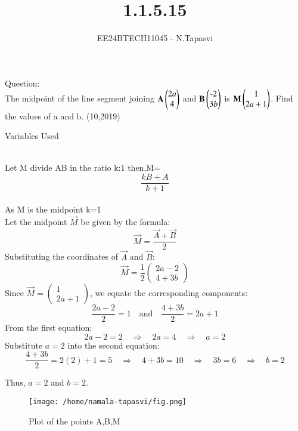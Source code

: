 \documentclass[journal]{IEEEtran}
\begin{document}

\vspace{3cm}

\title{1.1.5.15}
\author{EE24BTECH11045 - N.Tapasvi}
{\let\newpage\relax\maketitle}
Question:\\
The midpoint of the line segment joining $\mathbf{A}\begin{pmatrix}2a\\4\end{pmatrix}$ and $\mathbf{B}\begin{pmatrix}\text{-}2\\3b\end{pmatrix}$ is $\mathbf{M}\begin{pmatrix}1\\2a+1\end{pmatrix}$. Find the values of a and b.
\hfill (10,2019)

\solution
\begin{table}[h!]    
  \centering
  
  \caption{Variables Used}
  \label{tab1-1.5-15}
\end{table}\\

Let M divide AB in the ratio k:1
then,M=$$\frac{kB+A}{k+1}$$\\


As M is the midpoint k=1\\

Let the midpoint \( \vec{M} \) be given by the formula:
\[
\vec{M} = \frac{\vec{A} + \vec{B}}{2}
\]
Substituting the coordinates of \( \vec{A} \) and \( \vec{B} \):
\[
\vec{M} = \frac{1}{2} \begin{pmatrix} 2a - 2 \\ 4 + 3b \end{pmatrix}
\]
Since \( \vec{M} = \begin{pmatrix} 1 \\ 2a+1 \end{pmatrix} \), we equate the corresponding components:
\[
\frac{2a - 2}{2} = 1 \quad \text{and} \quad \frac{4 + 3b}{2} = 2a + 1
\]
From the first equation:
\[
2a - 2 = 2 \quad \Rightarrow \quad 2a = 4 \quad \Rightarrow \quad a = 2
\]
Substitute \( a = 2 \) into the second equation:
\[
\frac{4 + 3b}{2} = 2(2) + 1 = 5 \quad \Rightarrow \quad 4 + 3b = 10 \quad \Rightarrow \quad 3b = 6 \quad \Rightarrow \quad b = 2
\]

Thus, \( a = 2 \) and \( b = 2 \).


\begin{figure}[h!]
   \centering
	\texttt{[image: /home/namala-tapasvi/fig.png]}
   \caption{Plot of the points A,B,M}
   \label{stemplot}
\end{figure}
\end{document}
